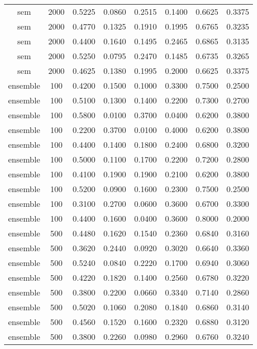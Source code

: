 \begin{table}[h!]
\begin{tabularx}{\textwidth}{cccccccc}
		sem      & 2000 & 0.5225 & 0.0860 & 0.2515 & 0.1400 & 0.6625 & 0.3375 \\
		sem      & 2000 & 0.4770 & 0.1325 & 0.1910 & 0.1995 & 0.6765 & 0.3235 \\
		sem      & 2000 & 0.4400 & 0.1640 & 0.1495 & 0.2465 & 0.6865 & 0.3135 \\
		sem      & 2000 & 0.5250 & 0.0795 & 0.2470 & 0.1485 & 0.6735 & 0.3265 \\
		sem      & 2000 & 0.4625 & 0.1380 & 0.1995 & 0.2000 & 0.6625 & 0.3375 \\
		ensemble & 100  & 0.4200 & 0.1500 & 0.1000 & 0.3300 & 0.7500 & 0.2500 \\
		ensemble & 100  & 0.5100 & 0.1300 & 0.1400 & 0.2200 & 0.7300 & 0.2700 \\
		ensemble & 100  & 0.5800 & 0.0100 & 0.3700 & 0.0400 & 0.6200 & 0.3800 \\
		ensemble & 100  & 0.2200 & 0.3700 & 0.0100 & 0.4000 & 0.6200 & 0.3800 \\
		ensemble & 100  & 0.4400 & 0.1400 & 0.1800 & 0.2400 & 0.6800 & 0.3200 \\
		ensemble & 100  & 0.5000 & 0.1100 & 0.1700 & 0.2200 & 0.7200 & 0.2800 \\
		ensemble & 100  & 0.4100 & 0.1900 & 0.1900 & 0.2100 & 0.6200 & 0.3800 \\
		ensemble & 100  & 0.5200 & 0.0900 & 0.1600 & 0.2300 & 0.7500 & 0.2500 \\
		ensemble & 100  & 0.3100 & 0.2700 & 0.0600 & 0.3600 & 0.6700 & 0.3300 \\
		ensemble & 100  & 0.4400 & 0.1600 & 0.0400 & 0.3600 & 0.8000 & 0.2000 \\
		ensemble & 500  & 0.4480 & 0.1620 & 0.1540 & 0.2360 & 0.6840 & 0.3160 \\
		ensemble & 500  & 0.3620 & 0.2440 & 0.0920 & 0.3020 & 0.6640 & 0.3360 \\
		ensemble & 500  & 0.5240 & 0.0840 & 0.2220 & 0.1700 & 0.6940 & 0.3060 \\
		ensemble & 500  & 0.4220 & 0.1820 & 0.1400 & 0.2560 & 0.6780 & 0.3220 \\
		ensemble & 500  & 0.3800 & 0.2200 & 0.0660 & 0.3340 & 0.7140 & 0.2860 \\
		ensemble & 500  & 0.5020 & 0.1060 & 0.2080 & 0.1840 & 0.6860 & 0.3140 \\
		ensemble & 500  & 0.4560 & 0.1520 & 0.1600 & 0.2320 & 0.6880 & 0.3120 \\
		ensemble & 500  & 0.3800 & 0.2260 & 0.0980 & 0.2960 & 0.6760 & 0.3240 \\

\end{tabularx}
\end{table}
